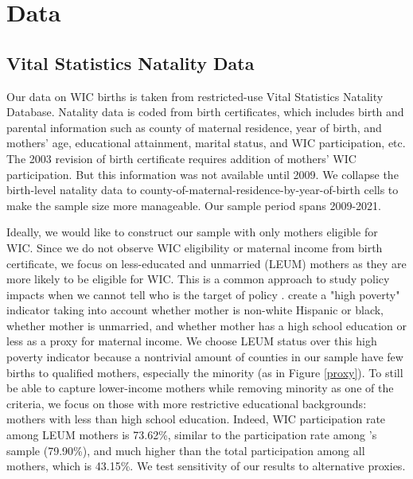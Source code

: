 \section{Data}
\subsection{Vital Statistics Natality Data}
Our data on WIC births is taken from restricted-use Vital Statistics Natality Database. Natality data is coded from birth certificates, which includes birth and parental information such as county of maternal residence, year of birth, and mothers' age, educational attainment, marital status, and WIC participation, etc. The 2003 revision of birth certificate requires addition of mothers' WIC participation. But this information was not available until 2009. We collapse the birth-level natality data to
county-of-maternal-residence-by-year-of-birth cells to make the sample size more manageable. Our sample period spans 2009-2021.

Ideally, we would like to construct our sample with only mothers eligible for WIC. Since we do not observe WIC eligibility or maternal income from birth certificate, we focus on less-educated and unmarried (LEUM) mothers as they are more likely to be eligible for WIC. This is a common approach to study policy impacts when we cannot tell who is the target of policy \citep{meckel2020cure,alsan2022fear, east2023labor}. \cite{meckel2020cure} create a "high poverty" indicator taking into account whether mother is non-white Hispanic or black, whether mother is unmarried, and whether mother has a high school education or less as a proxy for maternal income. We choose LEUM status over this high poverty indicator because a nontrivial amount of counties in our sample have few births to qualified mothers, especially the minority (as in Figure \ref{proxy}). To still be able to capture lower-income mothers while removing minority as one of the criteria, we focus on those with more restrictive educational backgrounds: mothers with less than high school education. Indeed, WIC participation rate among LEUM mothers is 73.62\%, similar to the participation rate among \cite{meckel2020cure}'s sample (79.90\%), and much higher than the total participation among all mothers, which is 43.15\%. We test sensitivity of our results to alternative proxies.

